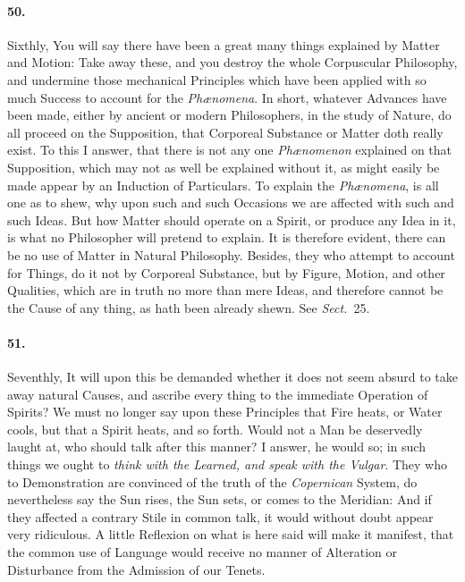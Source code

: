 \documentclass[]{article}
\newenvironment{sectionbody}{}{}
\begin{document}
\begin{sectionbody}
\paragraph{50.} Sixthly, You will say there have been a great many things
explained by Matter and Motion: Take away these, and you destroy
the whole Corpuscular Philosophy, and undermine those mechanical
Principles which have been applied with so much Success to
account for the \emph{Ph{\ae}nomena}.  In short, whatever
Advances have been made, either by ancient or modern
Philosophers, in the study of Nature, do all proceed on the
Supposition, that Corporeal Substance or Matter doth really
exist.  To this I answer, that there is not any one
\emph{Ph{\ae}nomenon} explained on that Supposition, which may
not as well be explained without it, as might easily be made
appear by an Induction of Particulars.  To explain the
\emph{Ph{\ae}nomena}, is all one as to shew, why upon such
and such Occasions we are affected with such and such Ideas.  But
how Matter should operate on a Spirit, or produce any Idea in it,
is what no Philosopher will pretend to explain.  It is therefore
evident, there can be no use of Matter in Natural Philosophy.
Besides, they who attempt to account for Things, do it not by
Corporeal Substance, but by Figure, Motion, and other Qualities,
which are in truth no more than mere Ideas, and therefore cannot
be the Cause of any thing, as hath been already shewn.
See \emph{Sect.}~25.



\paragraph{51.} Seventhly, It will upon this be demanded whether it does not seem
absurd to take away natural Causes, and ascribe every thing to
the immediate Operation of Spirits? We must no longer say upon
these Principles that Fire heats, or Water cools, but that a
Spirit heats, and so forth.  Would not a Man be deservedly laught
at, who should talk after this manner? I answer, he would so; in
such things we ought to \emph{think with the Learned, and speak
with the Vulgar}. They who to Demonstration are convinced of the
truth of the \emph{Copernican} System, do nevertheless say the
Sun rises, the Sun sets, or comes to the Meridian: And if they
affected a contrary Stile in common talk, it would without doubt
appear very ridiculous.  A little Reflexion on what is here said
will make it manifest, that the common use of Language would
receive no manner of Alteration or Disturbance from the Admission
of our Tenets.




\end{sectionbody}
\end{document}
